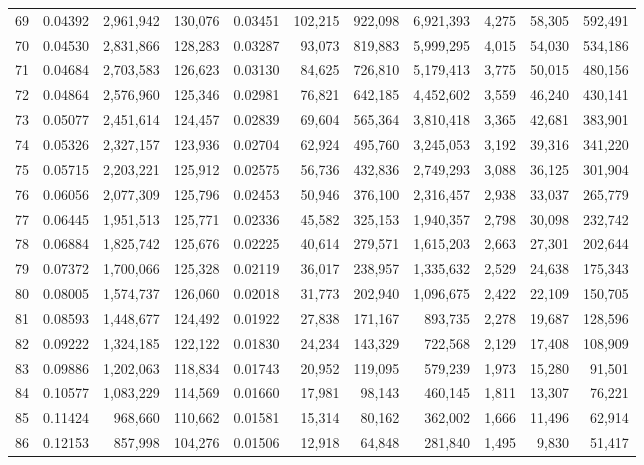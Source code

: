 \begin{landscape}
\begin{longtable}{rrrrrrrrrrr}
69 & 0.04392 & 2,961,942 & 130,076 & 0.03451 & 102,215 & 922,098 & 6,921,393 & 4,275 & 58,305 & 592,491 \\
70 & 0.04530 & 2,831,866 & 128,283 & 0.03287 & 93,073 & 819,883 & 5,999,295 & 4,015 & 54,030 & 534,186 \\
71 & 0.04684 & 2,703,583 & 126,623 & 0.03130 & 84,625 & 726,810 & 5,179,413 & 3,775 & 50,015 & 480,156 \\
72 & 0.04864 & 2,576,960 & 125,346 & 0.02981 & 76,821 & 642,185 & 4,452,602 & 3,559 & 46,240 & 430,141 \\
73 & 0.05077 & 2,451,614 & 124,457 & 0.02839 & 69,604 & 565,364 & 3,810,418 & 3,365 & 42,681 & 383,901 \\
74 & 0.05326 & 2,327,157 & 123,936 & 0.02704 & 62,924 & 495,760 & 3,245,053 & 3,192 & 39,316 & 341,220 \\
75 & 0.05715 & 2,203,221 & 125,912 & 0.02575 & 56,736 & 432,836 & 2,749,293 & 3,088 & 36,125 & 301,904 \\
76 & 0.06056 & 2,077,309 & 125,796 & 0.02453 & 50,946 & 376,100 & 2,316,457 & 2,938 & 33,037 & 265,779 \\
77 & 0.06445 & 1,951,513 & 125,771 & 0.02336 & 45,582 & 325,153 & 1,940,357 & 2,798 & 30,098 & 232,742 \\
78 & 0.06884 & 1,825,742 & 125,676 & 0.02225 & 40,614 & 279,571 & 1,615,203 & 2,663 & 27,301 & 202,644 \\
79 & 0.07372 & 1,700,066 & 125,328 & 0.02119 & 36,017 & 238,957 & 1,335,632 & 2,529 & 24,638 & 175,343 \\
80 & 0.08005 & 1,574,737 & 126,060 & 0.02018 & 31,773 & 202,940 & 1,096,675 & 2,422 & 22,109 & 150,705 \\
81 & 0.08593 & 1,448,677 & 124,492 & 0.01922 & 27,838 & 171,167 & 893,735 & 2,278 & 19,687 & 128,596 \\
82 & 0.09222 & 1,324,185 & 122,122 & 0.01830 & 24,234 & 143,329 & 722,568 & 2,129 & 17,408 & 108,909 \\
83 & 0.09886 & 1,202,063 & 118,834 & 0.01743 & 20,952 & 119,095 & 579,239 & 1,973 & 15,280 & 91,501 \\
84 & 0.10577 & 1,083,229 & 114,569 & 0.01660 & 17,981 & 98,143 & 460,145 & 1,811 & 13,307 & 76,221 \\
85 & 0.11424 & 968,660 & 110,662 & 0.01581 & 15,314 & 80,162 & 362,002 & 1,666 & 11,496 & 62,914 \\
86 & 0.12153 & 857,998 & 104,276 & 0.01506 & 12,918 & 64,848 & 281,840 & 1,495 & 9,830 & 51,417 \\

\end{longtable}
\end{landscape}
